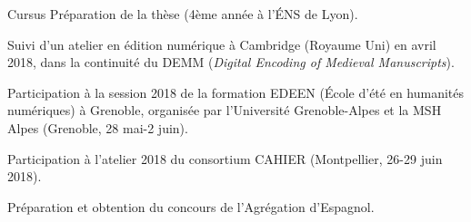 \begin{rubric}{Cursus}
                                \entry*[2017-2018]
                            Préparation de la thèse (4ème année à l'ÉNS de Lyon). 
                    
                                \entry*
                            Suivi d'un atelier en édition numérique à Cambridge (Royaume Uni) en
                        avril 2018, dans la continuité du DEMM (\textit{Digital Encoding of Medieval
                        Manuscripts}).
                    
                                \entry*
                            Participation à la session 2018 de la formation EDEEN (École d'été en
                        humanités numériques) à Grenoble, organisée par l'Université Grenoble-Alpes
                        et la MSH Alpes (Grenoble, 28 mai-2 juin).
                    
                                \entry*
                            Participation à l'atelier 2018 du consortium CAHIER (Montpellier,
                        26-29 juin 2018).
                    
                                \entry*[2016-2017]
                            Préparation et obtention du concours de l'Agrégation d'Espagnol. 
                    

\end{rubric}
